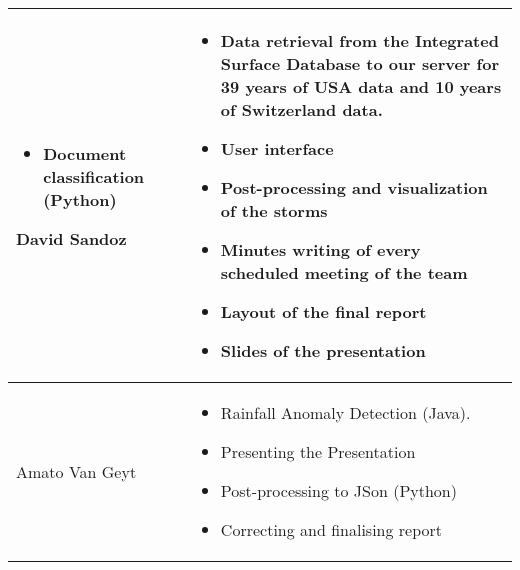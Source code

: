 \begin{longtable}{|l|p{10.5cm}|}
\begin{itemize}
	\item Document classification (Python)
\end{itemize}
\hline
David Sandoz &
\begin{itemize}
	\item Data retrieval from the Integrated Surface Database to our server for 39 years of USA data and 10 years of Switzerland data.
	\item User interface
	\item Post-processing and visualization of the storms
	\item Minutes writing of every scheduled meeting of the team
	\item Layout of the final report
	\item Slides of the presentation
\end{itemize}\\
\hline
Amato Van Geyt & \begin{itemize}
	\item Rainfall Anomaly Detection (Java).
	\item Presenting the Presentation
	\item Post-processing to JSon (Python)
	\item Correcting and finalising report
\end{itemize}\\ 
\hline
\end{longtable}
